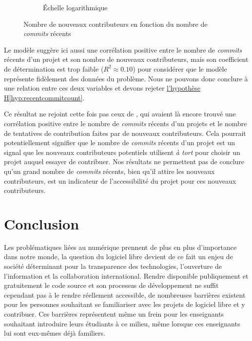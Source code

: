 \documentclass[dvipsnames,runningheads]{llncs}
\newcommand{\en}[1]{\foreignlanguage{english}{\emph{#1}}}
\begin{document}
\begin{figure}[ht]
\begin{subfigure}[t]{0.5\textwidth}
            \caption{Échelle logarithmique}
        \end{subfigure}

        

        

        \caption{Nombre de nouveaux contributeurs en fonction du nombre de \emph{commits} récents}
        \label{fig:commitCount}
    \end{figure}

    Le modèle suggère ici aussi une corrélation positive entre le nombre de \en{commits} récents d'un projet
    et son nombre de nouveaux contributeurs, mais son coefficient de détermination est trop faible ($R^2
    \approx 0.10$) pour considérer que le modèle représente fidèlement des données du problème. Nous ne
    pouvons donc conclure à une relation entre ces deux variables et devons rejeter
    \hyperref[hyp:recentcommitcount]{l'hypothèse H\ref*{hyp:recentcommitcount}}.

    Ce résultat ne rejoint cette fois pas ceux de \textcite[p.~13,16]{signals-2019}, qui avaient là encore
    trouvé une corrélation positive entre le nombre de \en{commits} récents d'un projets et le nombre de
    tentatives de contribution faites par de nouveaux contributeurs. Cela pourrait potentiellement signifier
    que le nombre de \en{commits} récents d'un projet est un signal que les nouveaux contributeurs potentiels
    utilisent \emph{à tort} pour choisir un projet auquel essayer de contribuer. Nos résultats ne permettent
    pas de conclure qu'un grand nombre de \en{commits} récents, bien qu'il attire les nouveaux contributeurs,
    est un indicateur de l'accessibilité du projet pour ces nouveaux contributeurs.

    \section{Conclusion}

    Les problématiques liées au numérique prennent de plus en plus d'importance dans notre monde, la question
    du logiciel libre devient de ce fait un enjeu de société déterminant pour la transparence des
    technologies, l'ouverture de l'information et la collaboration international. Rendre disponible
    publiquement et gratuitement le code source et son processus de développement ne suffit cependant pas à le
    rendre réellement accessible, de nombreuses barrières existent pour les personnes souhaitant se
    familiariser avec les projets de logiciel libre et y contribuer. Ces barrières représentent même un frein
    pour les enseignants souhaitant introduire leurs étudiants à ce milieu, même lorsque ces enseignants lui
    sont eux-mêmes déjà familiers.
\end{document}
